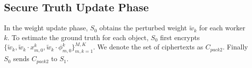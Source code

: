 \documentclass[conference]{IEEEtran}
\begin{document}

\subsection{Secure Truth Update Phase}

In the weight update phase, $S_0$ obtains the perturbed weight $\tilde{w}_k$ for each worker $k$.
To estimate the ground truth for each object, $S_0$ first encrypts $\{\tilde{w}_k, \tilde{w}_k\cdot x_{m,0}^k, \tilde{w}_k\cdot \phi_{m,0}^k\}_{m,k=1}^{M,K}$.
We denote the set of ciphertexts as $C_{pack2}$.
Finally $S_0$ sends $C_{pack2}$ to $S_1$.
\end{document}
